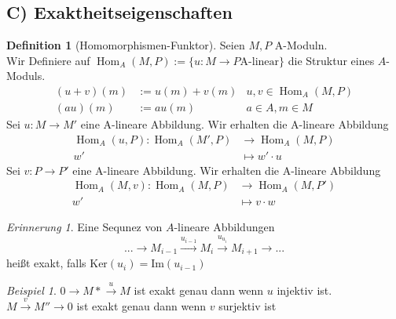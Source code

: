 \documentclass[10pt,a4paper]{article}
\newcommand{\Hom}{\operatorname{Hom}}
\newcounter{thm}[section]
\theoremstyle{definition}
\newtheorem{definition}[thm]{Definition}
\theoremstyle{plain}
\theoremstyle{remark}
\newtheorem{rem}[thm]{Erinnerung}
\newtheorem*{exm*}{Beispiel}
\begin{document}
\subsection*{C) Exaktheitseigenschaften}
\begin{definition}[Homomorphismen-Funktor]
	Seien $M,P$ A-Moduln.\\
	Wir Definiere auf $\Hom_A(M,P):=\{u:M\rightarrow P \text{A-linear}\}$ die Struktur eines $A$-Moduls.
	\begin{align*}
	(u+v)(m)&:=u(m)+v(m) &u,v\in\Hom_A(M,P)\\
	(au)(m)&:=au(m)		 &a\in A,m\in M
	\end{align*}
	Sei $u:M\rightarrow M'$ eine A-lineare Abbildung. Wir erhalten die A-lineare Abbildung
	\begin{align*}
	\Hom_A(u,P):\Hom_A(M',P)&\rightarrow \Hom_A(M,P)\\
	w'&\mapsto w'\cdot u
	\end{align*}
	Sei $v:P\rightarrow P'$ eine A-lineare Abbildung. Wir erhalten die A-lineare Abbildung
	\begin{align*}
	\Hom_A(M,v):\Hom_A(M,P)&\rightarrow \Hom_A(M,P')\\
	w'&\mapsto v\cdot w
	\end{align*}
\end{definition}

\begin{rem}
	Eine Sequnez von $A$-lineare Abbildungen\[...\rightarrow M_{i-1}\xrightarrow{u_{i-1}}M_i\xrightarrow{u_{u_i}}M_{i+1}\rightarrow ...\]
	heißt exakt, falls $\text{Ker}(u_i)=\text{Im}(u_{i-1})$
\end{rem}

\addtocounter{thm}{-1}

\begin{exm*}
	$0\rightarrow M*\xrightarrow{u}M$ ist exakt genau dann wenn $u$ injektiv ist.\\
	$M\xrightarrow{v}M''\rightarrow 0$ ist exakt genau dann wenn $v$ surjektiv ist
\end{exm*}
\end{document}
